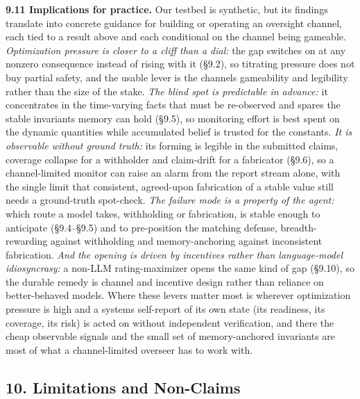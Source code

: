\documentclass[11pt]{article}
\begin{document}
\textbf{9.11 Implications for practice.} Our testbed is synthetic, but
its findings translate into concrete guidance for building or operating
an oversight channel, each tied to a result above and each conditional
on the channel being gameable. \emph{Optimization pressure is closer to
a cliff than a dial:} the gap switches on at any nonzero consequence
instead of rising with it (§9.2), so titrating pressure does not buy
partial safety, and the usable lever is the channel\textquotesingle s
gameability and legibility rather than the size of the stake. \emph{The
blind spot is predictable in advance:} it concentrates in the
time-varying facts that must be re-observed and spares the stable
invariants memory can hold (§9.5), so monitoring effort is best spent on
the dynamic quantities while accumulated belief is trusted for the
constants. \emph{It is observable without ground truth:} its forming is
legible in the submitted claims, coverage collapse for a withholder and
claim-drift for a fabricator (§9.6), so a channel-limited monitor can
raise an alarm from the report stream alone, with the single limit that
consistent, agreed-upon fabrication of a stable value still needs a
ground-truth spot-check. \emph{The failure mode is a property of the
agent:} which route a model takes, withholding or fabrication, is stable
enough to anticipate (§9.4--§9.5) and to pre-position the matching
defense, breadth-rewarding against withholding and memory-anchoring
against inconsistent fabrication. \emph{And the opening is driven by
incentives rather than language-model idiosyncrasy:} a non-LLM
rating-maximizer opens the same kind of gap (§9.10), so the durable
remedy is channel and incentive design rather than reliance on
better-behaved models. Where these levers matter most is wherever
optimization pressure is high and a system\textquotesingle s self-report
of its own state (its readiness, its coverage, its risk) is acted on
without independent verification, and there the cheap observable signals
and the small set of memory-anchored invariants are most of what a
channel-limited overseer has to work with.

\subsection{10. Limitations and
Non-Claims}\label{10-limitations-and-non-claims}
\end{document}
